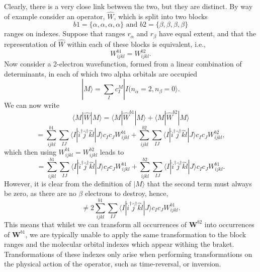 \noindent Clearly, there is a very close link between the two, but they are
distinct. By way of example consider an operator, $\hat{W}$, which is split
into two blocks 
\begin{equation*}
b1 = \{ \alpha,\alpha,\alpha,\alpha \} 
\text { \ \ \ \ and \ \ \ }  
b2 = \{ \beta,\beta,\beta,\beta \} 
\end{equation*}
ranges on indexes. Suppose that ranges $r_{\alpha}$ and $r_{\beta}$ have equal extent, and that 
the representation of $\hat{W}$ within each of these blocks is equivalent, i.e.,
\begin{equation}
W^{b1}_{ijkl}= W^{b2}_{ijkl}.
\end{equation}
Now consider a 2-electron wavefunction, formed from a linear combination of determinants, in each of which 
two alpha orbitals are occupied
\begin{equation}
|M\rangle = \sum_{I} c_{I}^{M} | I (n_{\alpha} = 2 , n_{\beta} = 0 \rangle.
\end{equation}
We can now write
\begin{equation*}
\langle M | \hat{W} |M\rangle = \langle M | \hat{W}^{b1} |M\rangle  + \langle M | \hat{W}^{b2} |M\rangle 
\end{equation*}
\begin{equation*}
= 
\sum_{ijkl}^{b1} \sum_{IJ}\langle I |\hat{i}^{\dagger}\hat{j}^{\dagger}\hat{k}\hat{l} | J \rangle c_{I}c_{J} W^{b1}_{ijkl}+
\sum_{ijkl}^{b2} \sum_{IJ}\langle I |\hat{i}^{\dagger}\hat{j}^{\dagger}\hat{k}\hat{l} | J \rangle c_{I}c_{J} W^{b2}_{ijkl},
\end{equation*}
which then using $W^{b1}_{ijkl}= W^{b2}_{ijkl}$ leads to 
\begin{equation*}
= 
\sum_{ijkl}^{b1} \sum_{IJ}\langle I |\hat{i}^{\dagger}\hat{j}^{\dagger}\hat{k}\hat{l} | J \rangle c_{I}c_{J} W^{b1}_{ijkl}+
\sum_{ijkl}^{b2} \sum_{IJ}\langle I |\hat{i}^{\dagger}\hat{j}^{\dagger}\hat{k}\hat{l} | J \rangle c_{I}c_{J} W^{b1}_{ijkl}.
\end{equation*}
However, it is clear from the definition of $|M\rangle$ that the second term must always be zero, as there are 
no $\beta$ electrons to destroy, hence,
\begin{equation*}
\neq 2 \sum_{ijkl}^{b1} \sum_{IJ}\langle I |\hat{i}^{\dagger}\hat{j}^{\dagger}\hat{k}\hat{l} | J \rangle c_{I}c_{J} W^{b1}_{ijkl}.
\end{equation*}
This means that whilst we can transform all occurrences of $\mathbf{W}^{b2}$
into occurrences of $\mathbf{W}^{b1}$, we are typically unable to apply the
same transformation to the block ranges and the molecular orbital indexes which
appear withing the braket. Transformations of these indexes only arise when
performing transformations on the physical action of the operator, such as
time-reversal, or inversion. \\

